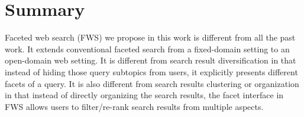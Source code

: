 

\section{Summary}
Faceted web search (FWS) we propose in this work is different from all the past work. It extends conventional faceted search from a fixed-domain setting to an open-domain web setting. It is different from search result diversification in that instead of hiding those query subtopics from users, it explicitly presents different facets of a query. It is also different from search results clustering or organization in that instead of directly organizing the search results, the facet interface in FWS allows users to filter/re-rank search results from multiple aspects.

